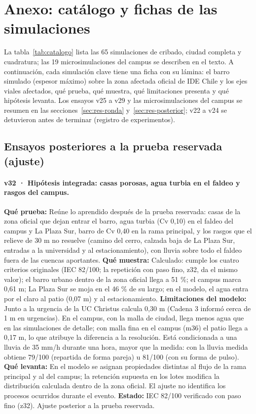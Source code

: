 \section{Anexo: catálogo y fichas de las simulaciones}\label{sec:anexo}

La tabla~\ref{tab:catalogo} lista las 65 simulaciones de cribado, ciudad completa y cuadratura; las 19 microsimulaciones del campus se describen en el texto. A continuación, cada simulación clave tiene una ficha con su lámina: el barro simulado (espesor máximo) sobre la zona afectada oficial de IDE Chile y los ejes viales afectados, qué prueba, qué muestra, qué limitaciones presenta y qué hipótesis levanta. Los ensayos v25 a v29 y las microsimulaciones del campus se resumen en las secciones~\ref{sec:res-ronda} y~\ref{sec:res-posterior}; v22 a v24 se detuvieron antes de terminar (registro de experimentos).



\subsection*{Ensayos posteriores a la prueba reservada (ajuste)}

\paragraph{v32 · Hipótesis integrada: casas porosas, agua turbia en el faldeo y rasgos del campus.} \textbf{Qué prueba:} Reúne lo aprendido después de la prueba reservada: casas de la zona oficial que dejan entrar el barro, agua turbia (Cv 0,10) en el faldeo del campus y La Plaza Sur, barro de Cv 0,40 en la rama principal, y los rasgos que el relieve de 30 m no resuelve (camino del cerro, calzada baja de La Plaza Sur, entradas a la universidad y al estacionamiento), con lluvia sobre todo el faldeo fuera de las cuencas aportantes. \textbf{Qué muestra:} Calculado: cumple los cuatro criterios originales (IEC 82/100; la repetición con paso fino, z32, da el mismo valor); el barro urbano dentro de la zona oficial llega a 51 \%; el campus marca 0,61 m; La Plaza Sur se moja en el 46 \% de su largo; en el modelo, el agua entra por el claro al patio (0,07 m) y al estacionamiento. \textbf{Limitaciones del modelo:} Junto a la urgencia de la UC Christus calcula 0,30 m (Cadena 3 informó cerca de 1 m en urgencias). En el campus, con la malla de ciudad, llega menos agua que en las simulaciones de detalle; con malla fina en el campus (m36) el patio llega a 0,17 m, lo que atribuye la diferencia a la resolución. Está condicionada a una lluvia de 35 mm/h durante una hora, mayor que la medida: con la lluvia medida obtiene 79/100 (repartida de forma pareja) u 81/100 (con su forma de pulso). \textbf{Qué levanta:} En el modelo se asignan propiedades distintas al flujo de la rama principal y al del campus; la retención supuesta en los lotes modifica la distribución calculada dentro de la zona oficial. El ajuste no identifica los procesos ocurridos durante el evento. \textbf{Estado:} IEC 82/100 verificado con paso fino (z32). Ajuste posterior a la prueba reservada.

